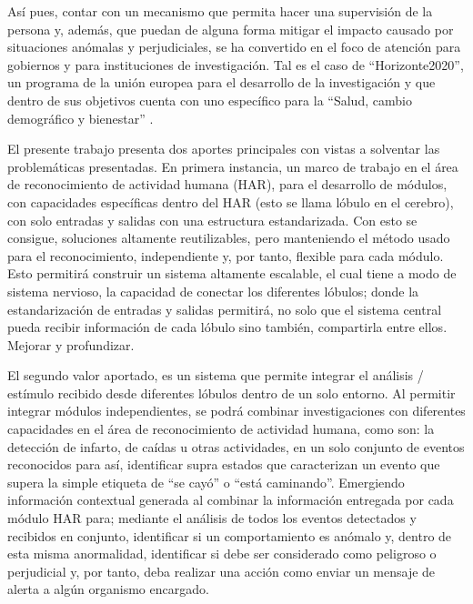    Así pues, contar con un mecanismo que permita hacer una supervisión de la persona y, además, que puedan de alguna forma mitigar el impacto causado por situaciones anómalas y perjudiciales, se ha convertido en el foco de atención para gobiernos y para instituciones de investigación. Tal es el caso de “Horizonte2020”, un programa de la unión europea para el desarrollo de la investigación y que dentro de sus objetivos cuenta con uno específico para la “Salud, cambio demográfico y bienestar” \cite{Horizonte2020}.
    
    El presente trabajo presenta dos aportes principales con vistas a solventar las problemáticas presentadas. En primera instancia, un marco de trabajo en el área de reconocimiento de actividad humana (HAR), para el desarrollo de módulos, con capacidades específicas dentro del HAR (esto se llama lóbulo en el cerebro), con solo entradas y salidas con una estructura estandarizada. Con esto se consigue, soluciones altamente reutilizables, pero manteniendo el método usado para el reconocimiento, independiente y, por tanto, flexible para cada módulo. Esto permitirá construir un sistema altamente escalable, el cual tiene a modo de sistema nervioso, la capacidad de conectar los diferentes lóbulos; donde la estandarización de entradas y salidas permitirá, no solo que el sistema central pueda recibir información de cada lóbulo sino también, compartirla entre ellos. Mejorar y profundizar.
    
    El segundo valor aportado, es un sistema que permite integrar el análisis / estímulo recibido desde diferentes lóbulos dentro de un solo entorno. Al permitir integrar módulos independientes, se podrá combinar investigaciones con diferentes capacidades en el área de reconocimiento de actividad humana, como son: la detección de infarto, de caídas u otras actividades, en un solo conjunto de eventos reconocidos para así, identificar supra estados que caracterizan un evento que supera la simple etiqueta de “se cayó” o “está caminando”. Emergiendo información contextual generada al combinar la información entregada por cada módulo HAR para; mediante el análisis de todos los eventos detectados y recibidos en conjunto, identificar si un comportamiento es anómalo y, dentro de esta misma anormalidad, identificar si debe ser considerado como peligroso o perjudicial y, por tanto, deba realizar una acción como enviar un mensaje de alerta a algún organismo encargado.
    
